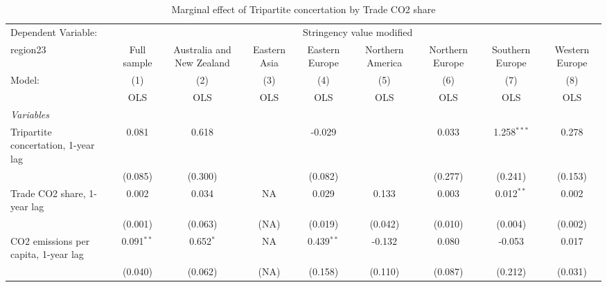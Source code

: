 
\begin{table}[htbp]
   \caption{Marginal effect of Tripartite concertation by Trade CO2 share}
   \centering
   \begin{tabular}{lcccccccc}
      \toprule
      Dependent Variable: & \multicolumn{8}{c}{Stringency value modified}\\
      region23                                                          & Full sample   & Australia and New Zealand & Eastern Asia & Eastern Europe & Northern America & Northern Europe & Southern Europe & Western Europe \\   
      Model:                                                            & (1)           & (2)                       & (3)          & (4)            & (5)              & (6)             & (7)             & (8)\\  
                                                                        &  OLS          & OLS                       & OLS          & OLS            & OLS              & OLS             & OLS             & OLS\\  
      \midrule
      \emph{Variables}\\
      Tripartite concertation, 1-year lag                               & 0.081         & 0.618                     &              & -0.029         &                  & 0.033           & 1.258$^{***}$   & 0.278\\   
                                                                        & (0.085)       & (0.300)                   &              & (0.082)        &                  & (0.277)         & (0.241)         & (0.153)\\   
      Trade CO2 share, 1-year lag                                       & 0.002         & 0.034                     & NA           & 0.029          & 0.133            & 0.003           & 0.012$^{**}$    & 0.002\\   
                                                                        & (0.001)       & (0.063)                   & (NA)         & (0.019)        & (0.042)          & (0.010)         & (0.004)         & (0.002)\\   
      CO2 emissions per capita, 1-year lag                              & 0.091$^{**}$  & 0.652$^{*}$               & NA           & 0.439$^{**}$   & -0.132           & 0.080           & -0.053          & 0.017\\   
                                                                        & (0.040)       & (0.062)                   & (NA)         & (0.158)        & (0.110)          & (0.087)         & (0.212)         & (0.031)\\   

\end{tabular}
\end{table}
